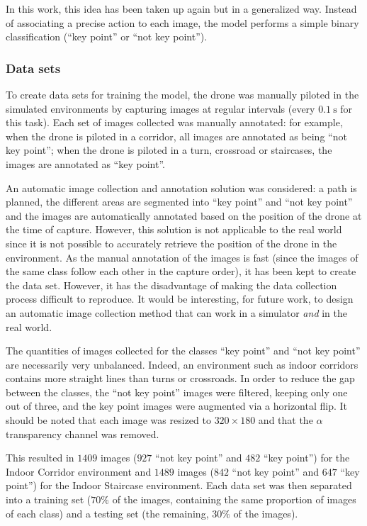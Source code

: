 In this work, this idea has been taken up again but in a generalized way. Instead of associating a precise action to each image, the model performs a simple binary classification (\enquote{key point} or \enquote{not key point}).

\subsubsection{Data sets}

To create data sets for training the model, the drone was manually piloted in the simulated environments by capturing images at regular intervals (every $\SI{0.1}{\second}$ for this task). Each set of images collected was manually annotated: for example, when the drone is piloted in a corridor, all images are annotated as being \enquote{not key point}; when the drone is piloted in a turn, crossroad or staircases, the images are annotated as \enquote{key point}.

\begin{note}
    An automatic image collection and annotation solution was considered: a path is planned, the different areas are segmented into \enquote{key point} and \enquote{not key point} and the images are automatically annotated based on the position of the drone at the time of capture. However, this solution is not applicable to the real world since it is not possible to accurately retrieve the position of the drone in the environment. As the manual annotation of the images is fast (since the images of the same class follow each other in the capture order), it has been kept to create the data set. However, it has the disadvantage of making the data collection process difficult to reproduce. It would be interesting, for future work, to design an automatic image collection method that can work in a simulator \emph{and} in the real world.
\end{note}

The quantities of images collected for the classes \enquote{key point} and \enquote{not key point} are necessarily very unbalanced. Indeed, an environment such as indoor corridors contains more straight lines than turns or crossroads. In order to reduce the gap between the classes, the \enquote{not key point} images were filtered, keeping only one out of three, and the key point images were augmented via a horizontal flip. It should be noted that each image was resized to $\num{320} \times \num{180}$ and that the $\alpha$ transparency channel was removed.

This resulted in $\num{1409}$ images ($\num{927}$ \enquote{not key point} and $\num{482}$ \enquote{key point}) for the Indoor Corridor environment and $\num{1489}$ images ($\num{842}$ \enquote{not key point} and $\num{647}$ \enquote{key point}) for the Indoor Staircase environment. Each data set was then separated into a training set ($70\%$ of the images, containing the same proportion of images of each class) and a testing set (the remaining, $30\%$ of the images).

